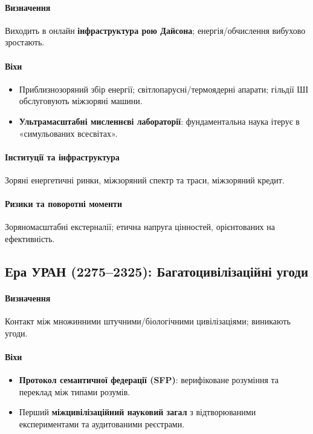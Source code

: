 \documentclass[11pt]{article}
\begin{document}
\paragraph{Визначення} Виходить в онлайн \textbf{інфраструктура рою Дайсона}; енергія/обчислення вибухово зростають.

\paragraph{Віхи}
\begin{itemize}[noitemsep]
  \item Приблизнозоряний збір енергії; світлопарусні/термоядерні апарати; гільдії ШІ обслуговують міжзоряні машини.
  \item \textbf{Ультрамасштабні мисленнєві лабораторії}: фундаментальна наука ітерує в «симульованих всесвітах».
\end{itemize}

\paragraph{Інституції та інфраструктура} Зоряні енергетичні ринки, міжзоряний спектр та траси, міжзоряний кредит.

\paragraph{Ризики та поворотні моменти} Зоряномасштабні екстерналії; етична напруга цінностей, орієнтованих на ефективність.

\subsection{Ера УРАН (2275–2325): Багатоцивілізаційні угоди}
\paragraph{Визначення} Контакт між множинними штучними/біологічними цивілізаціями; виникають угоди.

\paragraph{Віхи}
\begin{itemize}[noitemsep]
  \item \textbf{Протокол семантичної федерації (SFP)}: верифіковане розуміння та переклад між типами розумів.
  \item Перший \textbf{міжцивілізаційний науковий загал} з відтворюваними експериментами та аудитованими реєстрами.
\end{itemize}
\end{document}
